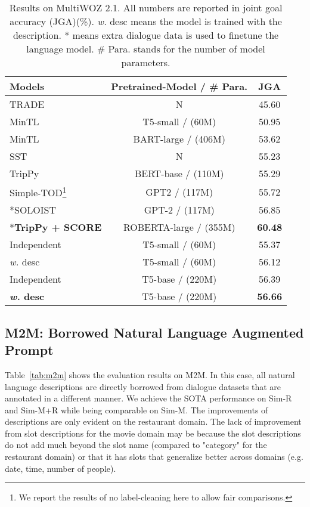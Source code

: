 \documentclass[11pt]{article}
\begin{document}
\begin{table}[t]
    \small
    \centering

    \begin{tabular}{l@{\hskip3pt}c@{\hskip3pt}c}
    \toprule
        \textbf{Models} & \textbf{Pretrained-Model / \# Para.} &  \textbf{JGA}  \\
        \midrule
        TRADE & N & 45.60\\
MinTL  & T5-small / (60M) & 50.95\\
        MinTL   & BART-large / (406M) & 53.62 \\
        SST  & N &  55.23 \\
        TripPy   & BERT-base / (110M) &  55.29 \\
        Simple-TOD\footnote{We report the results of no label-cleaning here to allow fair comparisons.}  & GPT2 / (117M) & 55.72  \\
        \midrule
        *SOLOIST  &  GPT-2 / (117M) & 56.85  \\
        *\textbf{TripPy + SCORE} & ROBERTA-large / (355M) & \textbf{60.48} \\
        \midrule
        \midrule 
Independent & T5-small / (60M)   & 55.37  \\
        \quad \textit{w.} desc  &  T5-small / (60M)  & 56.12  \\
        Independent & T5-base / (220M)  &  56.39 \\
        \quad \textbf{\textit{w.} desc}  & T5-base / (220M) &  \textbf{56.66}\\
        \bottomrule
    \end{tabular}
        \caption{Results on MultiWOZ 2.1. All numbers are reported in joint goal accuracy (JGA)(\%). \textit{w.} desc means the model is trained with the description. * means extra dialogue data is used to finetune the language model. \# Para. stands for the number of model parameters. } 
    \label{tab:woz2.1}
\end{table}



\subsection{M2M: Borrowed Natural Language Augmented Prompt}
Table~\ref{tab:m2m} shows the evaluation results on M2M. 
In this case, all natural language descriptions are directly borrowed from dialogue datasets that are annotated in a different manner.
We achieve the SOTA performance on Sim-R and Sim-M+R while being comparable on Sim-M.  
The improvements of descriptions are only evident on the restaurant domain. 
The lack of improvement from slot descriptions for the movie domain may be because the slot descriptions do not add much beyond the slot name (compared to "category" for the restaurant domain) or that it has slots that generalize better across domains (e.g. date, time, number of people).
\end{document}
